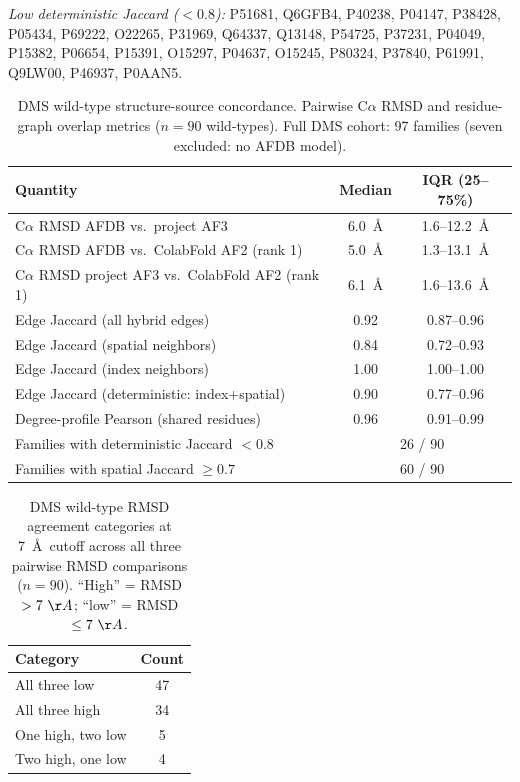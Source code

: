 \documentclass[11pt,a4paper]{article}
\begin{document}
\noindent\footnotesize\textit{Low deterministic Jaccard ($<0.8$):} P51681, Q6GFB4, P40238, P04147, P38428, P05434, P69222, O22265, P31969, Q64337, Q13148, P54725, P37231, P04049, P15382, P06654, P15391, O15297, P04637, O15245, P80324, P37840, P61991, Q9LW00, P46937, P0AAN5.
\normalsize

\begin{table}[H]
\centering
\footnotesize
\caption{DMS wild-type structure-source concordance. Pairwise C$\alpha$ RMSD and residue-graph overlap metrics ($n{=}90$ wild-types). Full DMS cohort: 97 families (seven excluded: no AFDB model).}
\label{tab:wt-graph-summary}
\begin{tabular}{lcc}
\hline
Quantity & Median & IQR (25--75\%) \\
\hline
C$\alpha$ RMSD AFDB vs.\ project AF3 & 6.0~\AA & 1.6--12.2~\AA \\
C$\alpha$ RMSD AFDB vs.\ ColabFold AF2 (rank 1) & 5.0~\AA & 1.3--13.1~\AA \\
C$\alpha$ RMSD project AF3 vs.\ ColabFold AF2 (rank 1) & 6.1~\AA & 1.6--13.6~\AA \\
Edge Jaccard (all hybrid edges) & 0.92 & 0.87--0.96 \\
Edge Jaccard (spatial neighbors) & 0.84 & 0.72--0.93 \\
Edge Jaccard (index neighbors) & 1.00 & 1.00--1.00 \\
Edge Jaccard (deterministic: index+spatial) & 0.90 & 0.77--0.96 \\
Degree-profile Pearson (shared residues) & 0.96 & 0.91--0.99 \\
Families with deterministic Jaccard $<0.8$ & \multicolumn{2}{c}{26 / 90} \\
Families with spatial Jaccard $\geq 0.7$ & \multicolumn{2}{c}{60 / 90} \\
\hline
\end{tabular}
\end{table}

\begin{table}[H]
\centering
\footnotesize
\caption{DMS wild-type RMSD agreement categories at 7~\AA\ cutoff across all three pairwise RMSD comparisons ($n{=}90$). ``High'' = RMSD $>7~\AA$; ``low'' = RMSD $\leq 7~\AA$.}
\label{tab:wt-rmsd-categories}
\begin{tabular}{lc}
\hline
Category & Count \\
\hline
All three low & 47 \\
All three high & 34 \\
One high, two low & 5 \\
Two high, one low & 4 \\
\hline
\end{tabular}
\end{table}
\end{document}
